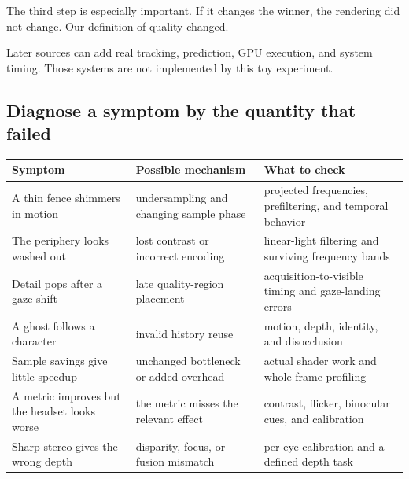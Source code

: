 The third step is especially important. If it changes the winner, the rendering did not change. Our definition of quality changed.

Later sources can add real tracking, prediction, GPU execution, and system timing. Those systems are not implemented by this toy experiment.

\subsection{Diagnose a symptom by the quantity that failed}\label{04-visual-computing-ii-ch043-diagnose-a-symptom-by-the-quantity-that-failed}

{\def\LTcaptype{none} %
\begin{longtable}[]{@{}
  >{\raggedright\arraybackslash}p{}
  >{\raggedright\arraybackslash}p{}
  >{\raggedright\arraybackslash}p{}@{}}
\toprule\noalign{}
\begin{minipage}[b]{\linewidth}\raggedright
Symptom
\end{minipage} & \begin{minipage}[b]{\linewidth}\raggedright
Possible mechanism
\end{minipage} & \begin{minipage}[b]{\linewidth}\raggedright
What to check
\end{minipage} \\
\midrule\noalign{}
\endhead
\bottomrule\noalign{}
\endlastfoot
A thin fence shimmers in motion & undersampling and changing sample phase & projected frequencies, prefiltering, and temporal behavior \\
The periphery looks washed out & lost contrast or incorrect encoding & linear-light filtering and surviving frequency bands \\
Detail pops after a gaze shift & late quality-region placement & acquisition-to-visible timing and gaze-landing errors \\
A ghost follows a character & invalid history reuse & motion, depth, identity, and disocclusion \\
Sample savings give little speedup & unchanged bottleneck or added overhead & actual shader work and whole-frame profiling \\
A metric improves but the headset looks worse & the metric misses the relevant effect & contrast, flicker, binocular cues, and calibration \\
Sharp stereo gives the wrong depth & disparity, focus, or fusion mismatch & per-eye calibration and a defined depth task \\
\end{longtable}
}

